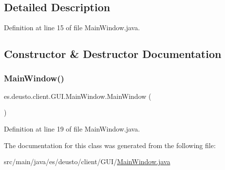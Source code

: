 \subsection{Detailed Description}


Definition at line 15 of file Main\+Window.\+java.



\subsection{Constructor \& Destructor Documentation}
\mbox{\label{classes_1_1deusto_1_1client_1_1_g_u_i_1_1_main_window_a471b4c0c749b9f22c1c74f85a410c1c9}} 
\subsubsection{\texorpdfstring{Main\+Window()}{MainWindow()}}
{\footnotesize\ttfamily es.\+deusto.\+client.\+G\+U\+I.\+Main\+Window.\+Main\+Window (\begin{DoxyParamCaption}{ }\end{DoxyParamCaption})}



Definition at line 19 of file Main\+Window.\+java.



The documentation for this class was generated from the following file\+:\begin{DoxyCompactItemize}
\item 
src/main/java/es/deusto/client/\+G\+U\+I/\hyperlink{_main_window_8java}{Main\+Window.\+java}\end{DoxyCompactItemize}
